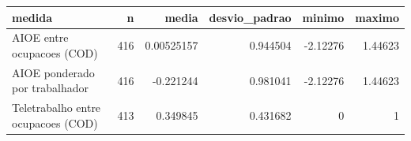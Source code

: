 \begin{tabular}{lrrrrr}
\toprule
medida & n & media & desvio\_padrao & minimo & maximo \\
\midrule
AIOE entre ocupacoes (COD) & 416 & 0.00525157 & 0.944504 & -2.12276 & 1.44623 \\
AIOE ponderado por trabalhador & 416 & -0.221244 & 0.981041 & -2.12276 & 1.44623 \\
Teletrabalho entre ocupacoes (COD) & 413 & 0.349845 & 0.431682 & 0 & 1 \\
\bottomrule
\end{tabular}
